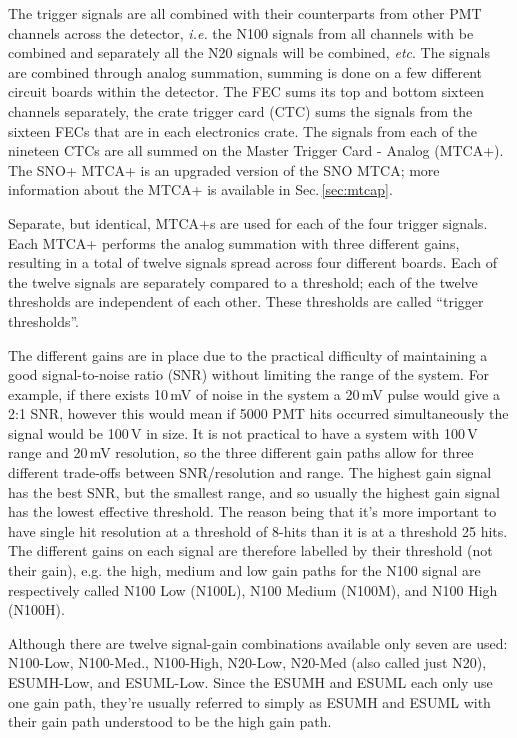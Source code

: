 The trigger signals are all combined with their counterparts from
other PMT channels across the detector, \textit{i.e.} the N100 signals
from all channels with be combined and separately all the
N20 signals will be combined, \textit{etc}.
The signals are combined through analog summation, summing is done on a few different
circuit boards within the detector.
The FEC sums its top and bottom sixteen channels separately, the crate
trigger card (CTC) sums the signals from the sixteen
FECs that are in each electronics crate.
The signals from each of the nineteen CTCs are all summed on the
Master Trigger Card - Analog (MTCA+). The SNO+ MTCA+ is an upgraded
version of the SNO MTCA\@; more information about the MTCA+ is available in
Sec.\,\ref{sec:mtcap}.

Separate, but identical, MTCA+s are used for each of the four trigger signals.
Each MTCA+ performs the analog summation with three different gains,
resulting in a total of twelve signals spread across four different boards.
Each of the twelve signals are separately compared to a threshold;
each of the twelve thresholds are independent of each other.
These thresholds are called ``trigger thresholds''.

The different gains are in place due to the practical difficulty of maintaining
a good signal-to-noise ratio (SNR) without limiting the range of the
system.
For example, if there exists 10\,mV of noise in the system a 20\,mV pulse
would give a 2:1 SNR, however this would mean if 5000 PMT hits occurred simultaneously
the signal would be 100\,V in size.
It is not practical to have a system with 100\,V range and 20\,mV resolution,
so the three different gain paths allow for three different trade-offs between
SNR/resolution and range.
The highest gain signal has the best SNR, but the smallest range, and so usually
the highest gain signal has the lowest effective threshold.
The reason being that it's more important to have single hit resolution at a threshold
of 8-hits than it is at a threshold 25 hits.
The different gains on each signal are therefore labelled by their threshold (not their gain), e.g.
the high, medium and low gain paths for the N100 signal are respectively called
N100 Low (N100L), N100 Medium (N100M), and N100 High (N100H).

Although there are twelve signal-gain combinations available only seven are
used: N100-Low, N100-Med., N100-High, N20-Low, N20-Med (also called just N20), ESUMH-Low, and ESUML-Low.
Since the ESUMH and ESUML each only use one gain path, they're usually
referred to simply as ESUMH and ESUML with their gain path understood to be
the high gain path.

